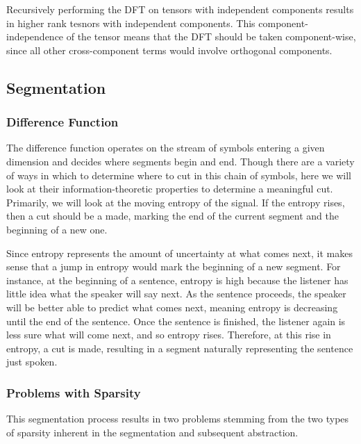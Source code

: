 \documentclass[runningheads]{llncs}
\begin{document}
Recursively performing the DFT on tensors with independent components results in higher rank tesnors with independent components.  This component-independence of the tensor means that the DFT should be taken component-wise, since all other cross-component terms would involve orthogonal components.


\subsection{Segmentation}

\subsubsection{Difference Function}
The difference function operates on the stream of symbols entering a given dimension and decides where segments begin and end.  Though there are a variety of ways in which to determine where to cut in this chain of symbols, here we will look at their information-theoretic properties to determine a meaningful cut. Primarily, we will look at the moving entropy of the signal.  If the entropy rises, then a cut should be a made, marking the end of the current segment and the beginning of a new one.

Since entropy represents the amount of uncertainty at what comes next, it makes sense that a jump in entropy would mark the beginning of a new segment.  For instance, at the beginning of a sentence, entropy is high because the listener has little idea what the speaker will say next. As the sentence proceeds, the speaker will be better able to predict what comes next, meaning entropy is decreasing until the end of the sentence.  Once the sentence is finished, the listener again is less sure what will come next, and so entropy rises.  Therefore, at this rise in entropy, a cut is made, resulting in a segment naturally representing the sentence just spoken.

\subsubsection{Problems with Sparsity}
This segmentation process results in two problems stemming from the two types of sparsity inherent in the segmentation and subsequent abstraction.
\end{document}

